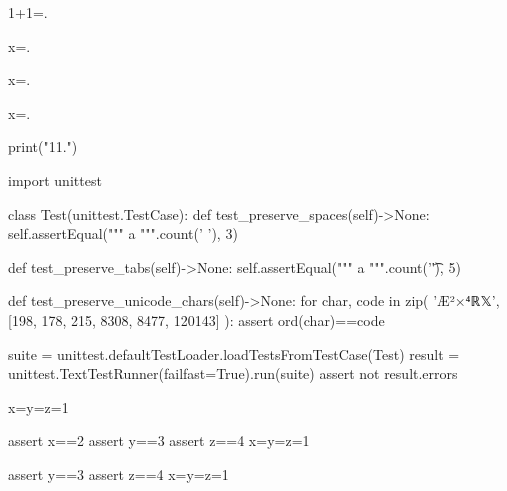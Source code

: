 \documentclass[a5paper]{article}
\begin{document}
1+1=.


x=.


x=.  %

x=.  %

\begin{pycode}
print("11.\n")
\end{pycode}

\begin{pycode}
\end{pycode}


\begin{pycode}

import unittest

class Test(unittest.TestCase):
	def test_preserve_spaces(self)->None:
		self.assertEqual("""
  a 
""".count(' '), 3)

	def test_preserve_tabs(self)->None:
		self.assertEqual("""
		a			
""".count('\t'), 5)

	def test_preserve_unicode_chars(self)->None:
		for char, code in zip(
					   'Æ²×⁴ℝ𝕏',
					   [198, 178, 215, 8308, 8477, 120143]
					   ):
			assert ord(char)==code

suite = unittest.defaultTestLoader.loadTestsFromTestCase(Test)
result = unittest.TextTestRunner(failfast=True).run(suite)
assert not result.errors


x=y=z=1
\end{pycode}

\def\testFilePath{helper_file.py}
\def\letYThree{y=3}
\def\letZFour{z=4}

\pyfile{\testFilePath}  %
\pyc{\letYThree}
\pycq{\letZFour}

\begin{pycode}
assert x==2
assert y==3
assert z==4
x=y=z=1
\end{pycode}


\begin{pycode}
assert y==3
assert z==4
x=y=z=1
\end{pycode}

\end{document}
